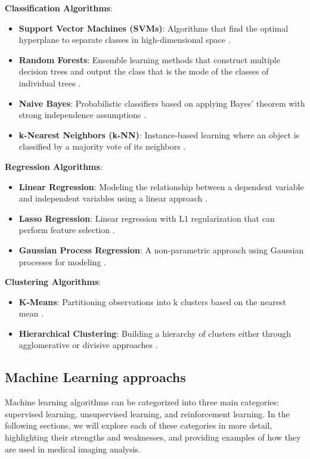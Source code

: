 \textbf{Classification Algorithms}:
\begin{itemize}
  \item \textbf{Support Vector Machines (SVMs)}: Algorithms that find the optimal hyperplane to separate classes in high-dimensional space \cite{cortes1995support}.
  \item \textbf{Random Forests}: Ensemble learning methods that construct multiple decision trees and output the class that is the mode of the classes of individual trees \cite{breiman2001random}.
  \item \textbf{Naive Bayes}: Probabilistic classifiers based on applying Bayes' theorem with strong independence assumptions \cite{rish2001empirical}.
  \item \textbf{k-Nearest Neighbors (k-NN)}: Instance-based learning where an object is classified by a majority vote of its neighbors \cite{cover1967nearest}.
\end{itemize}

\textbf{Regression Algorithms}:
\begin{itemize}
  \item \textbf{Linear Regression}: Modeling the relationship between a dependent variable and independent variables using a linear approach \cite{montgomery2021introduction}.
  \item \textbf{Lasso Regression}: Linear regression with L1 regularization that can perform feature selection \cite{tibshirani1996regression}.
  \item \textbf{Gaussian Process Regression}: A non-parametric approach using Gaussian processes for modeling \cite{rasmussen2003gaussian}.
\end{itemize}

\textbf{Clustering Algorithms}:
\begin{itemize}
  \item \textbf{K-Means}: Partitioning observations into k clusters based on the nearest mean \cite{macqueen1967some}.
  \item \textbf{Hierarchical Clustering}: Building a hierarchy of clusters either through agglomerative or divisive approaches \cite{johnson1967hierarchical}.
\end{itemize}

\subsection{Machine Learning approachs}
Machine learning algorithms can be categorized into three main categories: supervised learning, unsupervised learning, and reinforcement learning. In the following sections, we will explore each of these categories in more detail, highlighting their strengths and weaknesses, and providing examples of how they are used in medical imaging analysis.
